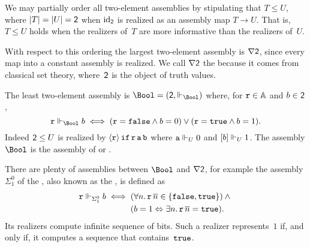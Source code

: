 We may partially order all two-element assemblies by stipulating that $T \leq U$, where $\S{T} = \S{U} = \two$ when $\id[\two]$ is realized as an assembly map $T \to U$.
That is, $T \leq U$ holds when the realizers of~$T$ are more informative than the realizers of~$U$.

With respect to this ordering the largest two-element assembly is $\nabla \two$, since every map into a constant assembly is realized. We call $\nabla \two$ the  because it comes from classical set theory, where~$\two$ is the object of truth values.

The least two-element assembly is $\Bool = (\two, {\rz[\Bool]})$ where, for $\R{r} \in \AA$ and $b \in \two$,
%
\begin{equation*}
  \R{r} \rz[\Bool] b
  \iff
  (\R{r} = \combFalse \land b = 0) \lor
  (\R{r} = \combTrue \land b = 1).
\end{equation*}
%
Indeed $\two \leq U$ is realized by $\pcalam{\R{r}} \combIf\,\R{r}\,\R{a}\,\R{b}$ where $\R{a} \rz[U] 0$ and $\R[b] \rz[U] 1$.
%
The assembly $\Bool$ is the assembly of  or .

There are plenty of assemblies between $\Bool$ and $\nabla \two$, for example the assembly $\Sigma^0_1$ of the , also known as the , is defined as
%
\begin{equation*}
  \R{r} \rz[\Sigma^0_1] b
  \iff
  \begin{aligned}[t]
  & (\all{n} \R{r}\,\overline{n} \in \set{\combFalse, \combTrue})
  \land {} \\
  & (b = 1 \liff \some{n} \R{r}\,\overline{n} = \combTrue).
  \end{aligned}
\end{equation*}
%
Its realizers compute infinite sequence of bits. Such a realizer represents~$1$ if, and only if, it computes a sequence that contains~$\combTrue$.

